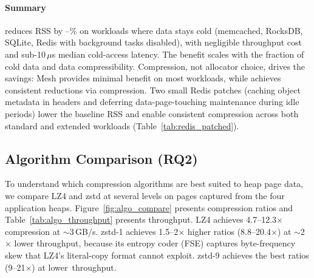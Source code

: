 \paragraph{Summary}
\sys reduces RSS by \rssRedMin--\rssRedMax\% on workloads where data stays cold
(memcached, RocksDB, SQLite, Redis with background tasks disabled),
with negligible throughput cost and sub-10\,$\mu$s median
cold-access latency.
The benefit scales with the fraction of cold data and data
compressibility.  Compression, not allocator choice,
drives the savings: Mesh provides minimal benefit on most workloads,
while \sys achieves consistent reductions via compression.
Two small Redis patches (caching object metadata in headers and
deferring data-page-touching maintenance during idle periods)
lower the baseline RSS and enable consistent compression
across both standard and extended workloads
(Table~\ref{tab:redis_patched}).

\subsection{Algorithm Comparison (RQ2)}
\label{sec:eval:algo}

To understand which compression algorithms are best suited to heap
page data, we compare LZ4 and zstd at several levels on
pages captured from the four application heaps.
Figure~\ref{fig:algo_compare} presents compression ratios and
Table~\ref{tab:algo_throughput} presents throughput.  LZ4 achieves 4.7--12.3$\times$ compression at
$\sim$3\,GB/s.  zstd-1 achieves 1.5--2$\times$ higher ratios
(8.8--20.4$\times$) at $\sim$2$\times$ lower throughput, because its
entropy coder (FSE) captures byte-frequency skew that LZ4's
literal-copy format cannot exploit.  zstd-9 achieves the best
ratios (9--21$\times$) at lower~throughput.

